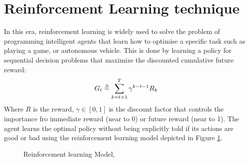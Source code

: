 \section{Reinforcement Learning technique}\label{sec2}
In this era, reinforcement learning is widely used to solve the problem of programming intelligent agents that learn how to optimise a specific task such as playing a game, or autonomous vehicle. This is done by learning a policy for sequential decision problems that maximize the discounted  cumulative future reward:
\begin{equation}
	G_t \overset{\scriptscriptstyle\Delta}{=} \sum_{k=t+1}^{T} \gamma^{k-t-1}R_k
\end{equation}
Where $R$ is the reward, $\gamma\in [0,1]$ is the discount factor that controls the importance fro immediate reward (near to 0) or future reward (near to 1). The agent learns the optimal policy without being explicitly told if its actions are good or bad using the reinforcement learning model depicted in Figure \ref{fig:RL}.


\begin{figure}
	\centering
	\caption{Reinforcement learning Model, \cite{lecture, book}}
	\label{fig:RL}
\end{figure}

